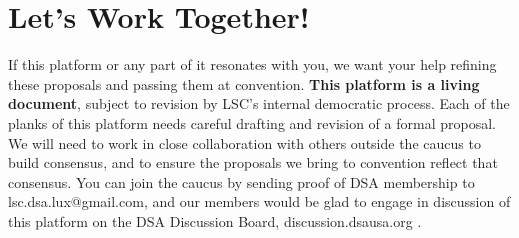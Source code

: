 \documentclass[10pt]{memoir}
\begin{document}
\pagebreak

\section*{Let's Work Together!}
If this platform or any part of it resonates with you, we want your help refining these proposals and passing them at convention. \textbf{This platform is a living document}, subject to revision by LSC’s internal democratic process. Each of the planks of this platform needs careful drafting and revision of a formal proposal. We will need to work in close collaboration with others outside the caucus to build consensus, and to ensure the proposals we bring to convention reflect that consensus. You can join the caucus by sending proof of DSA membership to lsc.dsa.lux@gmail.com, and our members would be glad to engage in discussion of this platform on the DSA Discussion Board, discussion.dsausa.org .

\theendnotes
\end{document}
